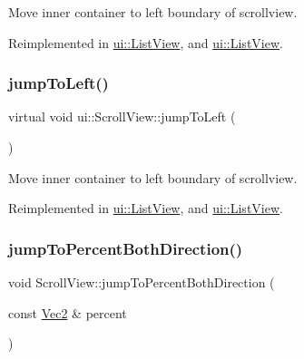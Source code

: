 Move inner container to left boundary of scrollview. 

Reimplemented in \hyperlink{classui_1_1ListView_a141ba140d285c6cc7eba00c9a6dc1efc}{ui\+::\+List\+View}, and \hyperlink{classui_1_1ListView_a80457edf6517c62347fab9583e6ad063}{ui\+::\+List\+View}.

\mbox{\label{classui_1_1ScrollView_a12212f997efa29c01841850ea790f60a}} 
\subsubsection{\texorpdfstring{jump\+To\+Left()}{jumpToLeft()}\hspace{0.1cm}{\footnotesize\ttfamily [2/2]}}
{\footnotesize\ttfamily virtual void ui\+::\+Scroll\+View\+::jump\+To\+Left (\begin{DoxyParamCaption}{ }\end{DoxyParamCaption})\hspace{0.3cm}{\ttfamily [virtual]}}

Move inner container to left boundary of scrollview. 

Reimplemented in \hyperlink{classui_1_1ListView_a141ba140d285c6cc7eba00c9a6dc1efc}{ui\+::\+List\+View}, and \hyperlink{classui_1_1ListView_a80457edf6517c62347fab9583e6ad063}{ui\+::\+List\+View}.

\mbox{\label{classui_1_1ScrollView_a288c35e8d899c4455f5574099fc17d1d}} 
\subsubsection{\texorpdfstring{jump\+To\+Percent\+Both\+Direction()}{jumpToPercentBothDirection()}\hspace{0.1cm}{\footnotesize\ttfamily [1/2]}}
{\footnotesize\ttfamily void Scroll\+View\+::jump\+To\+Percent\+Both\+Direction (\begin{DoxyParamCaption}\item[{const \hyperlink{classVec2}{Vec2} \&}]{percent }\end{DoxyParamCaption})\hspace{0.3cm}{\ttfamily [virtual]}}

